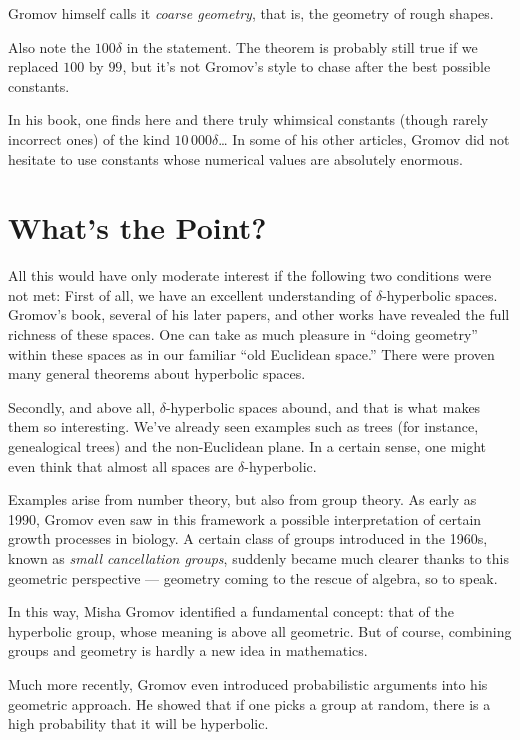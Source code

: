 \documentclass{amsart}
\begin{document}
Gromov himself calls it \textit{coarse geometry}, that is, the geometry
of rough shapes.

Also note the $100\delta$ in the statement. The theorem is probably
still true if we replaced $100$ by $99$, but it’s not Gromov’s style
to chase after the best possible constants.

In his book, one finds here and there truly whimsical constants
(though rarely incorrect ones) of the kind $10\,000\delta$\dots{} In
some of his other articles, Gromov did not hesitate to use constants
whose numerical values are absolutely enormous.

\section{What’s the Point?}

All this would have only moderate interest if the following two
conditions were not met:
First of all, we have an excellent understanding of $\delta$-hyperbolic
spaces. Gromov’s book, several of his later papers, and other works
have revealed the full richness of these spaces. One can take as much
pleasure in ``doing geometry'' within these spaces as in our familiar
``old Euclidean space.'' There were proven many general theorems about
hyperbolic spaces.

Secondly, and above all, $\delta$-hyperbolic spaces abound, and that
is what makes them so interesting. We’ve already seen examples such as
trees (for instance, genealogical trees) and the non-Euclidean
plane. In a certain sense, one might even think that almost all spaces
are $\delta$-hyperbolic.

Examples arise from number theory, but also from group theory. As
early as 1990, Gromov even saw in this framework a possible
interpretation of certain growth processes in biology. A certain class
of groups introduced in the 1960s, known as \textit{small cancellation
  groups}, suddenly became much clearer thanks to this geometric
perspective --- geometry coming to the rescue of algebra, so to speak.

In this way, Misha Gromov identified a fundamental concept: that of
the hyperbolic group, whose meaning is above all geometric. But
of course, combining groups and geometry is hardly a new idea in
mathematics.

Much more recently, Gromov even introduced probabilistic arguments
into his geometric approach. He showed that if one picks a group at
random, there is a high probability that it will be hyperbolic.
\end{document}
